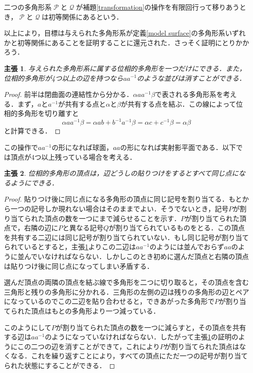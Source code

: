 \documentclass[dvipdfmx,uplatex]{jsarticle}
\newtheorem{claimindep}{主張}
\begin{document}
\begin{definition}
二つの多角形系$\mscrP$と$\mscrQ$が補題\ref{transformation}の操作を有限回行って移りあうとき，$\mscrP$と$\mscrQ$は初等関係にあるという．
\end{definition}

以上により，目標は与えられた多角形系が定義\ref{model surface}の多角形系いずれかと初等関係にあることを証明することに還元された．さっそく証明にとりかかろう．

\begin{claimindep}\label{slide}
与えられた多角形系に属する位相的多角形を一つだけにできる．また，位相的多角形が4つ以上の辺を持つなら$aa^{-1}$のような並びは消すことができる．
\end{claimindep}

\begin{proof}
前半は閉曲面の連結性から分かる．$\alpha a a^{-1} \beta$で表される多角形系を考える．まず，$a$と$a^{-1}$が共有する点と$\alpha$と$\beta$が共有する点を結ぶ．この線によって位相的多角形を切り離すと
\[ \alpha aa^{-1}\beta=\alpha ab+b^{-1}a^{-1}\beta=\alpha c+c^{-1}\beta=\alpha\beta \]
と計算できる．
\end{proof}

この操作で$aa^{-1}$の形になれば球面，$aa$の形になれば実射影平面である．以下では頂点が4つ以上残っている場合を考える．

\begin{claimindep}\label{single vertex}
位相的多角形の頂点は，辺どうしの貼りつけをするとすべて同じ点になるようにできる．
\end{claimindep}

\begin{proof}
貼りつけ後に同じ点になる多角形の頂点に同じ記号を割り当てる．もとから一つの記号しか現れない場合はそのままでよい．そうでないとき，記号$P$が割り当てられた頂点の数を一つにまで減らせることを示す．$P$が割り当てられた頂点で，右隣の辺に$P$と異なる記号$Q$が割り当てられているものをとる．この頂点を共有する二辺には同じ記号が割り当てられていない．もし同じ記号が割り当てられているとすると，主張\ref{slide}よりこの二辺は$aa^{-1}$のようには並んでおらず$aa$のように並んでいなければならない．しかしこのとき初めに選んだ頂点と右隣の頂点は貼りつけ後に同じ点になってしまい矛盾する．

選んだ頂点の両隣の頂点を結ぶ線で多角形を二つに切り取ると，その頂点を含む三角形と残りの多角形に分かれる．三角形の左側の辺は残りの多角形の辺とペアになっているのでこの二辺を貼り合わせると，できあがった多角形で$P$が割り当てられた頂点はもとの多角形より一つ減っている．

このようにして$P$が割り当てられた頂点の数を一つに減らすと，その頂点を共有する辺は$aa^{-1}$のようになっていなければならない．したがって主張\ref{slide}の証明のようにこの二つの辺を消すことができて，これにより$P$が割り当てられた頂点はなくなる．これを繰り返すことにより，すべての頂点にただ一つの記号が割り当てられた状態にすることができる．
\end{proof}
\end{document}
